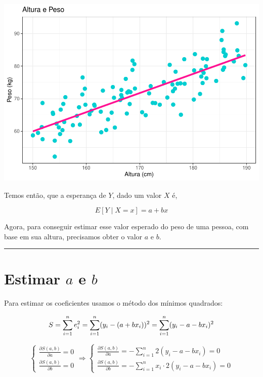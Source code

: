 \documentclass[
]{book}
\begin{document}
\begin{center}\includegraphics{AED_files/figure-latex/graf_regrecao-1} \end{center}

Temos então, que a esperança de \(Y\), dado um valor \(X\) é,

\[
E[Y \mid X = x] = a + bx
\]

Agora, para conseguir estimar esse valor esperado do peso de uma pessoa, com base em sua altura, precisamos obter o valor \(a\) e \(b\).

\begin{center}\rule{0.5\linewidth}{0.5pt}\end{center}

\section{\texorpdfstring{Estimar \(a\) e \(b\)}{Estimar a e b}}\label{estimar-a-e-b}

Para estimar os coeficientes usamos o método dos mínimos quadrados:

\[
S = \sum_{i=1}^{n} e_i^2 = \sum_{i=1}^{n} (y_i - (a + bx_i))^2 = \sum_{i=1}^{n} (y_i - a - bx_i)^2\\
\]

\[
\left\{
  \begin{array}{l}
    \frac{\partial S(a, b)}{\partial a} = 0 \\
    \frac{\partial S(a, b)}{\partial b} = 0
  \end{array}
\right.
\Longrightarrow
\left\{
  \begin{array}{l}
    \frac{\partial S(a, b)}{\partial a} = - \sum_{i=1}^{n} 2(y_i - a - b x_i) = 0 \\
    \frac{\partial S(a, b)}{\partial b} = - \sum_{i=1}^{n} x_i \cdot 2(y_i - a - b x_i) = 0
  \end{array}
\right.
\]
\end{document}
